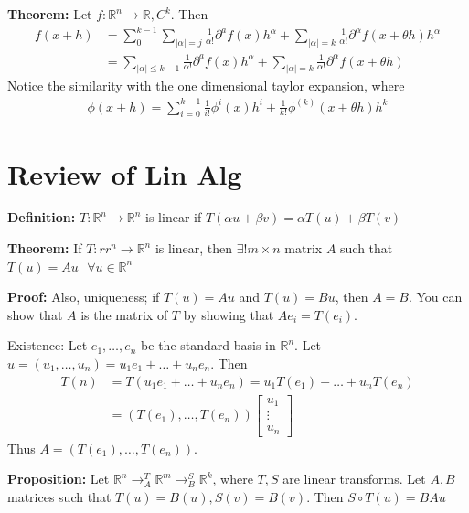 \documentclass{article}
\newcommand*{\txt}[1]{\text{ #1 }}%
\newcommand*{\fora}{\txt{}\forall}%
\newcommand*{\rr}{\mathbb{R}}%
\begin{document}
\textbf{Theorem:} Let $f:\rr^n\to\rr, C^k$. Then \begin{align*}
    f(x+h)&=\sum_{0}^{k-1}\sum_{|\alpha|=j}\frac{1}{\alpha!}\partial^a f(x)h^\alpha+\sum_{|\alpha|=k}\frac{1}{\alpha!}\partial^\alpha f(x+\theta h)h^\alpha\\
    &=\sum_{|\alpha|\leq k-1}\frac{1}{\alpha!}\partial^af(x)h^\alpha+\sum_{|\alpha|=k}\frac{1}{\alpha!}\partial^\alpha f(x+\theta h)
\end{align*} Notice the similarity with the one dimensional taylor expansion, where \begin{align*}
    \phi(x+h)=\sum_{i=0}^{k-1}\frac{1}{i!}\phi^i(x)h^i+\frac{1}{k!}\phi^{(k)}(x+\theta h)h^k
\end{align*}

\section{Review of Lin Alg}

\textbf{Definition:} $T:\rr^n\to \rr^n$ is linear if $T(\alpha u+\beta v)=\alpha T(u)+\beta T(v)$

\textbf{Theorem:} If $T:rr^n\to\rr^n$ is linear, then $\exists! m\times n$ matrix $A$ such that $T(u)=Au\fora u\in \rr^n$

\textbf{Proof:} Also, uniqueness; if $T(u)=Au$ and $T(u)=Bu$, then $A=B$. You can show that $A$ is the matrix of $T$ by showing that $Ae_i=T(e_i)$.

Existence: Let $e_1,\dots,e_n$ be the standard basis in $\rr^n$. Let $u=(u_1,\dots,u_n)=u_1e_1+\dots+u_ne_n$. Then \begin{align*}
    T(n)&=T(u_1e_1+\dots+u_ne_n)=u_1T(e_1)+\dots+u_nT(e_n)\\
    &=(T(e_1),\dots,T(e_n))\begin{bmatrix}
        u_1\\
        \vdots\\
        u_n
    \end{bmatrix}
\end{align*} Thus $A=(T(e_1),\dots,T(e_n))$.

\textbf{Proposition:} Let $\rr^n\to^T_A\rr^m\to^S_B\rr^k$, where $T,S$ are linear transforms. Let $A,B$ matrices such that $T(u)=B(u),S(v)=B(v)$. Then $S\circ T(u)=BAu$
\end{document}
